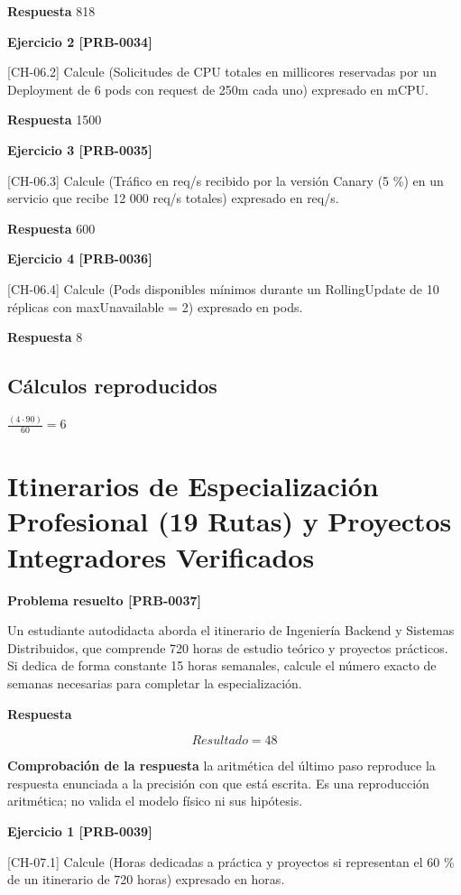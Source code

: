 \documentclass{book}
\begin{document}
\noindent\textbf{Respuesta} 818

\noindent\textbf{Ejercicio 2 [PRB-0034]}

[CH-06.2] Calcule (Solicitudes de CPU totales en millicores reservadas por un Deployment de 6 pods con request de 250m cada uno) expresado en mCPU.

\noindent\textbf{Respuesta} 1500

\noindent\textbf{Ejercicio 3 [PRB-0035]}

[CH-06.3] Calcule (Tráfico en req/s recibido por la versión Canary (5 \%) en un servicio que recibe 12 000 req/s totales) expresado en req/s.

\noindent\textbf{Respuesta} 600

\noindent\textbf{Ejercicio 4 [PRB-0036]}

[CH-06.4] Calcule (Pods disponibles mínimos durante un RollingUpdate de 10 réplicas con maxUnavailable = 2) expresado en pods.

\noindent\textbf{Respuesta} 8

\subsection*{Cálculos reproducidos}

\(\frac{\left(4\cdot 90\right)}{60} = 6\)

\section{Itinerarios de Especialización Profesional (19 Rutas) y Proyectos Integradores Verificados}

\noindent\textbf{Problema resuelto [PRB-0037]}

Un estudiante autodidacta aborda el itinerario de Ingeniería Backend y Sistemas Distribuidos, que comprende 720 horas de estudio teórico y proyectos prácticos. Si dedica de forma constante 15 horas semanales, calcule el número exacto de semanas necesarias para completar la especialización.

\noindent\textbf{Respuesta}

\[
Resultado = 48
\]

\noindent\textbf{Comprobación de la respuesta} la aritmética del último paso reproduce la respuesta enunciada a la precisión con que está escrita. Es una reproducción aritmética; no valida el modelo físico ni sus hipótesis.

\noindent\textbf{Ejercicio 1 [PRB-0039]}

[CH-07.1] Calcule (Horas dedicadas a práctica y proyectos si representan el 60 \% de un itinerario de 720 horas) expresado en horas.
\end{document}
